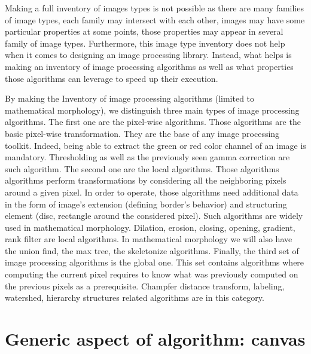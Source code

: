 Making a full inventory of images types is not possible as there are many families of image types, each family may
intersect with each other, images may have some particular properties at some points, those properties may appear in
several family of image types. Furthermore, this image type inventory does not help when it comes to designing an image
processing library. Instead, what helps is making an inventory of image processing algorithms as well as what properties
those algorithms can leverage to speed up their execution.

By making the Inventory of image processing algorithms (limited to mathematical morphology), we distinguish three main
types of image processing algorithms. The first one are the pixel-wise algorithms. Those algorithms are the basic
pixel-wise transformation. They are the base of any image processing toolkit. Indeed, being able to extract the green or
red color channel of an image is mandatory. Thresholding as well as the previously seen gamma correction are such
algorithm. The second one are the local algorithms. Those algorithms algorithms perform transformations by considering
all the neighboring pixels around a given pixel. In order to operate, those algorithms need additional data in the form
of image's extension (defining border's behavior) and structuring element (disc, rectangle around the considered pixel).
Such algorithms are widely used in mathematical morphology. Dilation, erosion, closing, opening, gradient, rank filter
are local algorithms. In mathematical morphology we will also have the union find, the max tree, the skeletonize
algorithms. Finally, the third set of image processing algorithms is the global one. This set contains algorithms where
computing the current pixel requires to know what was previously computed on the previous pixels as a prerequisite.
Champfer distance transform, labeling, watershed, hierarchy structures related algorithms are in this category.


\section{Generic aspect of algorithm: canvas}
\label{sec:canvas}

